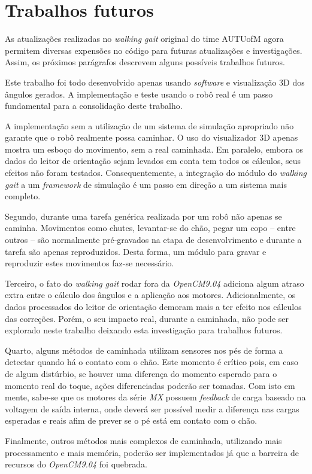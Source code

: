 \section{Trabalhos futuros}

As atualizações realizadas no \textit{walking gait} original do time AUTUofM agora permitem diversas expensões no código para futuras atualizações e investigações. Assim, os próximos parágrafos descrevem alguns possíveis trabalhos futuros.

Este trabalho foi todo desenvolvido apenas usando \textit{software} e visualização 3D dos ângulos gerados. A implementação e teste usando o robô real é um passo fundamental para a consolidação deste trabalho.

A implementação sem a utilização de um sistema de simulação apropriado não garante que o robô realmente possa caminhar. O uso do visualizador 3D apenas mostra um esboço do movimento, sem a real caminhada. Em paralelo, embora os dados do leitor de orientação sejam levados em conta tem todos os cálculos, seus efeitos não foram testados. Consequentemente, a integração do módulo do \textit{walking gait} a um \textit{framework} de simulação é um passo em direção a um sistema mais completo.

Segundo, durante uma tarefa genérica realizada por um robô não apenas se caminha. Movimentos como chutes, levantar-se do chão, pegar um copo -- entre outros -- são normalmente pré-gravados na etapa de desenvolvimento e durante a tarefa são apenas reproduzidos. Desta forma, um módulo para gravar e reproduzir estes movimentos faz-se necessário.

Terceiro, o fato do \textit{walking gait} rodar fora da \textit{OpenCM9.04} adiciona algum atraso extra entre o cálculo dos ângulos e a aplicação aos motores. Adicionalmente, os dados processados do leitor de orientação demoram mais a ter efeito nos cálculos das correções. Porém, o seu impacto real, durante a caminhada, não pode ser explorado neste trabalho deixando esta investigação para trabalhos futuros.

Quarto, alguns métodos de caminhada utilizam sensores nos pés de forma a detectar quando há o contato com o chão. Este momento é crítico pois, em caso de algum distúrbio, se houver uma diferença do momento esperado para o momento real do toque, ações diferenciadas poderão ser tomadas. Com isto em mente, sabe-se que os motores da série \textit{MX} possuem \textit{feedback} de carga baseado na voltagem de saída interna, onde deverá ser possível medir a diferença nas cargas esperadas e reais afim de prever se o pé está em contato com o chão.

Finalmente, outros métodos mais complexos de caminhada, utilizando mais processamento e mais memória, poderão ser implementados já que a barreira de recursos do \textit{OpenCM9.04} foi quebrada.